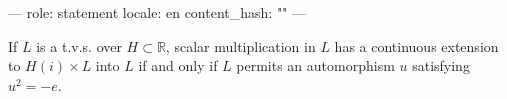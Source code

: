 ---
role: statement
locale: en
content_hash: ""
---

If $L$ is a t.v.s. over $H \subset \mathbb{R}$, scalar multiplication in $L$ has a continuous extension to $H(i) \times L$ into $L$ if and only if $L$ permits an automorphism $u$ satisfying $u^2 = -e$.
